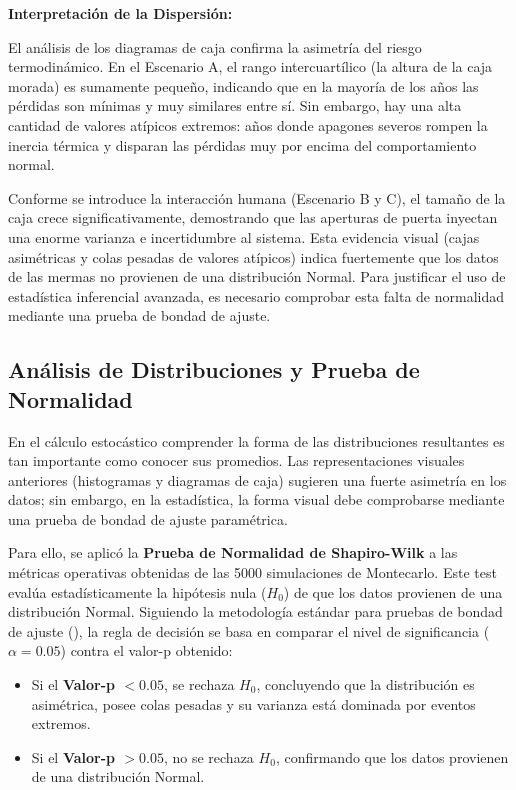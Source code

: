 \documentclass[
  spanish,
  letterpaper,
  DIV=11,
  numbers=noendperiod]{scrreprt}
\providecommand{\tightlist}{%
  \setlength{\itemsep}{0pt}\setlength{\parskip}{0pt}}
\theoremstyle{plain}
\theoremstyle{plain}
\theoremstyle{plain}
\theoremstyle{definition}
\theoremstyle{remark}
\begin{document}
\textbf{Interpretación de la Dispersión:}

El análisis de los diagramas de caja confirma la asimetría del riesgo
termodinámico. En el Escenario A, el rango intercuartílico (la altura de
la caja morada) es sumamente pequeño, indicando que en la mayoría de los
años las pérdidas son mínimas y muy similares entre sí. Sin embargo, hay
una alta cantidad de valores atípicos extremos: años donde apagones
severos rompen la inercia térmica y disparan las pérdidas muy por encima
del comportamiento normal.

Conforme se introduce la interacción humana (Escenario B y C), el tamaño
de la caja crece significativamente, demostrando que las aperturas de
puerta inyectan una enorme varianza e incertidumbre al sistema. Esta
evidencia visual (cajas asimétricas y colas pesadas de valores atípicos)
indica fuertemente que los datos de las mermas no provienen de una
distribución Normal. Para justificar el uso de estadística inferencial
avanzada, es necesario comprobar esta falta de normalidad mediante una
prueba de bondad de ajuste.

\subsection{Análisis de Distribuciones y Prueba de
Normalidad}\label{anuxe1lisis-de-distribuciones-y-prueba-de-normalidad}

En el cálculo estocástico comprender la forma de las distribuciones
resultantes es tan importante como conocer sus promedios. Las
representaciones visuales anteriores (histogramas y diagramas de caja)
sugieren una fuerte asimetría en los datos; sin embargo, en la
estadística, la forma visual debe comprobarse mediante una prueba de
bondad de ajuste paramétrica.

Para ello, se aplicó la \textbf{Prueba de Normalidad de Shapiro-Wilk} a
las métricas operativas obtenidas de las 5000 simulaciones de
Montecarlo. Este test evalúa estadísticamente la hipótesis nula
(\(H_0\)) de que los datos provienen de una distribución Normal.
Siguiendo la metodología estándar para pruebas de bondad de ajuste
(), la
regla de decisión se basa en comparar el nivel de significancia
(\(\alpha = 0.05\)) contra el valor-p obtenido:

\begin{itemize}
\tightlist
\item
  Si el \textbf{Valor-p \(< 0.05\)}, se rechaza \(H_0\), concluyendo que
  la distribución es asimétrica, posee colas pesadas y su varianza está
  dominada por eventos extremos.
\item
  Si el \textbf{Valor-p \(> 0.05\)}, no se rechaza \(H_0\), confirmando
  que los datos provienen de una distribución Normal.
\end{itemize}
\end{document}
